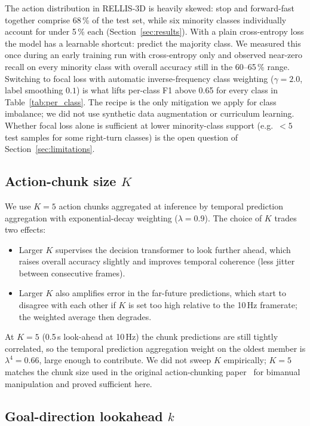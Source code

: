\documentclass[sensors,article,submit,pdftex,moreauthors]{Definitions/mdpi}
\begin{document}
The action distribution in RELLIS-3D is heavily skewed: stop and forward-fast together comprise 68\,\% of the test set, while six minority classes individually account for under 5\,\% each (Section~\ref{sec:results}). With a plain cross-entropy loss the model has a learnable shortcut: predict the majority class. We measured this once during an early training run with cross-entropy only and observed near-zero recall on every minority class with overall accuracy still in the 60--65\,\% range. Switching to focal loss with automatic inverse-frequency class weighting ($\gamma{=}2.0$, label smoothing $0.1$) is what lifts per-class F1 above 0.65 for every class in Table~\ref{tab:per_class}. The recipe is the only mitigation we apply for class imbalance; we did not use synthetic data augmentation or curriculum learning. Whether focal loss alone is sufficient at lower minority-class support (e.g.\ $<5$ test samples for some right-turn classes) is the open question of Section~\ref{sec:limitations}.

\subsection{Action-chunk size $K$}
\label{sec:ablation_chunk}

We use $K{=}5$ action chunks aggregated at inference by temporal prediction aggregation with exponential-decay weighting ($\lambda{=}0.9$). The choice of $K$ trades two effects:
\begin{itemize}
    \item Larger $K$ supervises the decision transformer to look further ahead, which raises overall accuracy slightly and improves temporal coherence (less jitter between consecutive frames).
    \item Larger $K$ also amplifies error in the far-future predictions, which start to disagree with each other if $K$ is set too high relative to the 10\,Hz framerate; the weighted average then degrades.
\end{itemize}
At $K{=}5$ (0.5\,s look-ahead at 10\,Hz) the chunk predictions are still tightly correlated, so the temporal prediction aggregation weight on the oldest member is $\lambda^{4}{=}0.66$, large enough to contribute. We did not sweep $K$ empirically; $K{=}5$ matches the chunk size used in the original action-chunking paper~\cite{zhao2023act} for bimanual manipulation and proved sufficient here.

\subsection{Goal-direction lookahead $k$}
\label{sec:ablation_goal}
\end{document}
